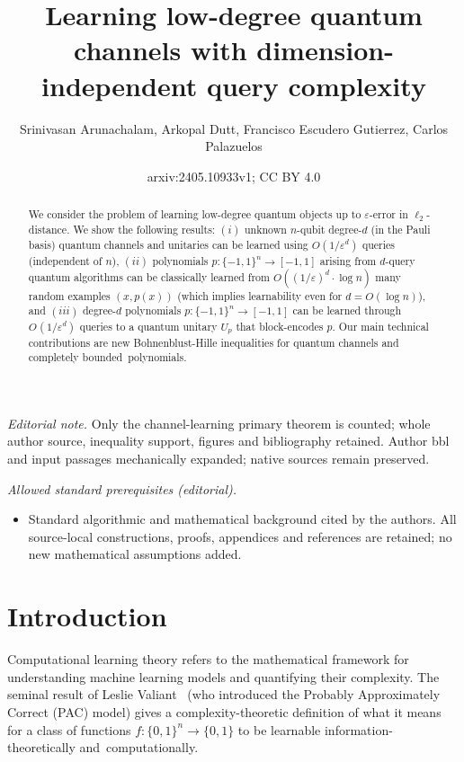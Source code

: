 \documentclass[11pt]{article}
\title{Learning low-degree quantum channels with dimension-independent query complexity}
\author{Srinivasan Arunachalam, Arkopal Dutt, Francisco Escudero Gutierrez, Carlos Palazuelos}
\date{arxiv:2405.10933v1; CC BY 4.0}
\def\01{\{0,1\}}
\newcommand{\eps}{\varepsilon}
\theoremstyle{plain}
\newcommand{\pmset}[1]{\{-1,1\}^{#1}} %
\theoremstyle{plain}
\theoremstyle{definition}
\theoremstyle{remark}
\theoremstyle{named}
\begin{document}
\maketitle
\noindent\textit{Editorial note.} Only the channel-learning primary theorem is counted; whole author source, inequality support, figures and bibliography retained. Author bbl and input passages mechanically expanded; native sources remain preserved.\par\medskip
\noindent\textit{Allowed standard prerequisites (editorial).}\begin{itemize}
\item Standard algorithmic and mathematical background cited by the authors. All source-local constructions, proofs, appendices and references are retained; no new mathematical assumptions added.
\end{itemize}\medskip


\begin{abstract}
  


We consider the problem of learning low-degree quantum objects up to $\varepsilon$-error in $\ell_2$-distance. We show the following results:
$(i)$ unknown $n$-qubit  degree-$d$ (in the Pauli basis) quantum channels and unitaries can be learned  using  $O(1/\varepsilon^d)$ queries (independent of $n$), $(ii)$ polynomials $p:\pmset{n}\rightarrow [-1,1]$ arising from  $d$-query quantum algorithms can be classically learned from $O((1/\varepsilon)^d\cdot \log n)$ many random examples $(x,p(x))$ (which implies learnability even for $d=O(\log n)$), and $(iii)$ degree-$d$ polynomials $p:\{-1,1\}^n\to [-1,1]$ can be learned through $O_{}(1/\eps^d)$ queries to a quantum unitary $U_p$ that block-encodes  $p$. Our main technical contributions are new Bohnenblust-Hille inequalities for quantum channels and completely bounded~polynomials.


\end{abstract}



\section{Introduction}
Computational learning theory refers to the mathematical framework for understanding  machine learning models and quantifying their complexity. The seminal result of Leslie Valiant~\cite{DBLP:journals/cacm/Valiant84} (who introduced the Probably Approximately Correct (PAC) model) gives a complexity-theoretic definition of what it means for a class of functions $f:\01^n\rightarrow \01$ to be learnable information-theoretically and~computationally. 
\end{document}
